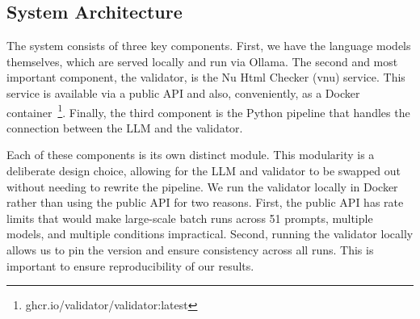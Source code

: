 \subsection{System Architecture}




The system consists of three key components. First, we have the language models themselves, which are served locally and run via Ollama. The second and most important component, the validator, is the Nu Html Checker (vnu) service. This service is available via a public API and also, conveniently, as a Docker container~\footnote{ghcr.io/validator/validator:latest}. Finally, the third component is the Python pipeline that handles the connection between the LLM and the validator.



Each of these components is its own distinct module. This modularity is a deliberate design choice, allowing for the LLM and validator to be swapped out without needing to rewrite the pipeline. We run the validator locally in Docker rather than using the public API for two reasons. First, the public API has rate limits that would make large-scale batch runs across 51 prompts, multiple models, and multiple conditions impractical. Second, running the validator locally allows us to pin the version and ensure consistency across all runs. This is important to ensure reproducibility of our results.

